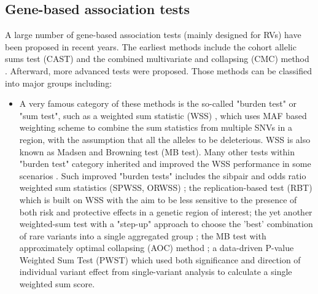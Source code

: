 \documentclass[12pt]{article}
\begin{document}
\subsection{Gene-based association tests}\label{sec:bg:Gb test}
A large number of gene-based association tests (mainly designed for RVs) have been proposed in recent years. The earliest methods include the cohort allelic sums test (CAST)\cite{Morgenthaler2007} and the combined multivariate and collapsing (CMC) method \cite{Li2008}. Afterward, more advanced tests were proposed. Those methods can be classified into major groups including:
\begin{itemize}
\item A very famous category of these methods is the so-called "burden test" or "sum test", such as a weighted sum statistic (WSS) \cite{Madsen2009}, which uses MAF based weighting scheme to combine the sum statistics from multiple SNVs in a region, with the assumption that all the alleles to be deleterious. WSS is also known as Madsen and Browning test (MB test). Many other tests within "burden test" category inherited and improved the WSS performance in some scenarios \cite{Hoffmann2010,Zhang2010,Ionita-Laza2011,Feng2011}. Such improved "burden tests" includes the sibpair and odds ratio weighted sum statistics (SPWSS, ORWSS) \cite{Zhu2010,Feng2011}; the replication-based test (RBT) \cite{Ionita-Laza2011} which is built on WSS with the aim to be less sensitive to the presence of both risk and protective effects in a genetic region of interest; the yet another weighted-sum test with a "step-up" approach to choose the 'best' combination of rare variants into a single aggregated group \cite{Hoffmann2010}; the MB test with approximately optimal collapsing (AOC) method \cite{Zhang2010}; a data-driven P-value Weighted Sum Test (PWST) \cite{Zhang2011} which used both significance and direction of individual variant effect from single-variant analysis to calculate a single weighted sum score.

\end{itemize}
\end{document}
